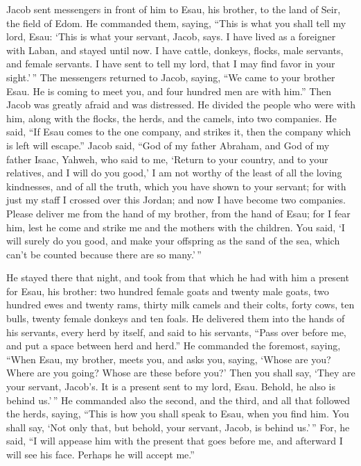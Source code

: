  Jacob sent messengers in front of him to Esau, his brother,
to the land of Seir, the field of Edom.  He commanded them,
saying, ``This is what you shall tell my lord, Esau: `This is what your
servant, Jacob, says. I have lived as a foreigner with Laban, and stayed
until now.  I have cattle, donkeys, flocks, male servants,
and female servants. I have sent to tell my lord, that I may find favor
in your sight.'\,''  The messengers returned to Jacob,
saying, ``We came to your brother Esau. He is coming to meet you, and
four hundred men are with him.''  Then Jacob was greatly
afraid and was distressed. He divided the people who were with him,
along with the flocks, the herds, and the camels, into two companies.
 He said, ``If Esau comes to the one company, and strikes
it, then the company which is left will escape.''  Jacob
said, ``God of my father Abraham, and God of my father Isaac, Yahweh,
who said to me, `Return to your country, and to your relatives, and I
will do you good,'  I am not worthy of the least of all the
loving kindnesses, and of all the truth, which you have shown to your
servant; for with just my staff I crossed over this Jordan; and now I
have become two companies.  Please deliver me from the hand
of my brother, from the hand of Esau; for I fear him, lest he come and
strike me and the mothers with the children.  You said, `I
will surely do you good, and make your offspring as the sand of the sea,
which can't be counted because there are so many.'\,''

 He stayed there that night, and took from that which he
had with him a present for Esau, his brother:  two hundred
female goats and twenty male goats, two hundred ewes and twenty rams,
 thirty milk camels and their colts, forty cows, ten bulls,
twenty female donkeys and ten foals.  He delivered them
into the hands of his servants, every herd by itself, and said to his
servants, ``Pass over before me, and put a space between herd and
herd.''  He commanded the foremost, saying, ``When Esau, my
brother, meets you, and asks you, saying, `Whose are you? Where are you
going? Whose are these before you?'  Then you shall say,
`They are your servant, Jacob's. It is a present sent to my lord, Esau.
Behold, he also is behind us.'\,''  He commanded also the
second, and the third, and all that followed the herds, saying, ``This
is how you shall speak to Esau, when you find him.  You
shall say, `Not only that, but behold, your servant, Jacob, is behind
us.'\,'' For, he said, ``I will appease him with the present that goes
before me, and afterward I will see his face. Perhaps he will accept
me.''

